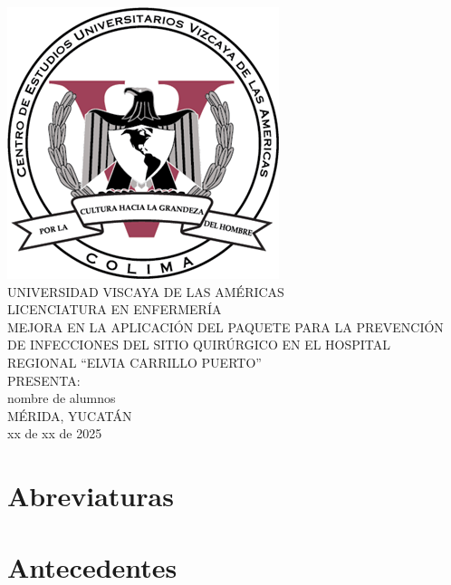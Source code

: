 \documentclass[12 pt]{report}
\begin{document}
	\begin{titlepage}
		\begin{center}
			\includegraphics [scale=0.5]{UVA-logo.png} \\
			\vspace{15 pt}
			\LARGE{UNIVERSIDAD VISCAYA DE LAS AMÉRICAS} \\
			\vspace{20 pt}
			\LARGE{LICENCIATURA EN ENFERMERÍA}\\
			\vspace{30 pt}
			\large{MEJORA EN LA APLICACIÓN DEL PAQUETE PARA LA PREVENCIÓN DE INFECCIONES DEL SITIO QUIRÚRGICO EN EL HOSPITAL REGIONAL ``ELVIA CARRILLO PUERTO'' }\\
			\vspace{40 pt}
			\large{PRESENTA:}\\
			\vspace{30 pt}
			\large{nombre de alumnos}\\
			\vspace{40 pt}
			\large{MÉRIDA, YUCATÁN}\\
			\large{xx de xx de 2025}		
		\end{center}
	\end{titlepage}	
	
	\tableofcontents
	\thispagestyle{empty}
	
	\begin{abstract}
		
	\end{abstract}
	
	
	\section*{Abreviaturas} 
	\section*{Antecedentes} 
\end{document}
